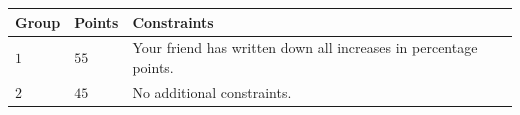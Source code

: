 \noindent
\begin{tabular}{| l | l | p{12cm} |}
  \hline
  \textbf{Group} & \textbf{Points} & \textbf{Constraints} \\ \hline
  $1$    & $55$      & Your friend has written down all increases in percentage points. \\ \hline
  $2$    & $45$      & No additional constraints. \\ \hline
\end{tabular}

